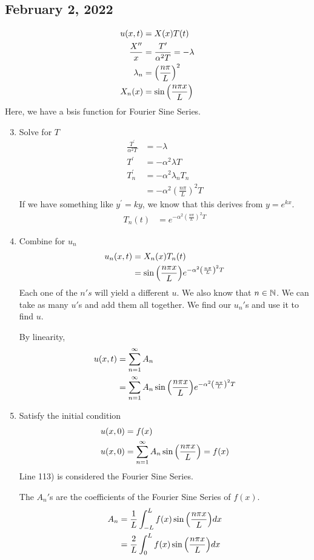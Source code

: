 \documentclass{article}
\begin{document}
\subsection*{February 2, 2022}
\begin{align}
  u(x, t) & = X(x)T(t)\\
  \frac{X^{\prime\prime}}{x} & = \frac{T^\prime}{\alpha^2 T} = - \lambda\\
  \lambda_n & = \left( \frac{n \pi}{L} \right)^2\\
  X_n(x) & = \sin \Big( \frac{n \pi x}{L} \Big)
\end{align}
Here, we have a bsis function for Fourier Sine Series.
\begin{enumerate}
  \setcounter{enumi}{2}
  \item Solve for $T$
  \begin{align}
    \frac{T^\prime}{\alpha^2 T} & = - \lambda\\
    T^\prime & = -\alpha^2 \lambda T\\
    T^\prime_n & = - \alpha^2 \lambda_n T_n\\
    & = -\alpha^2 \left( \frac{n \pi}{L} \right)^2 T
  \end{align}
  If we have something like $y^\prime = ky$, we know that this derives from $y = e^{kx}$.
  \begin{align}
    T_n(t) & = e^{-\alpha^2 \left( \frac{n \pi}{L} \right)^2 T}
  \end{align}
  \item Combine for $u_n$
  \begin{align}
    u_n(x, t) & = X_n(x)T_n(t)\\
    & = \sin \Big( \frac{n \pi x}{L} \Big) e^{-\alpha^2 \left( \frac{n \pi}{L} \right)^2 T}
  \end{align}
  Each one of the $n's$ will yield a different $u$. We also know that $n \in \mathbb N$. We can take as many $u'$s and add them all together. We find our $u_n'$s and use it to find $u$.

  By linearity,
  \begin{align}
    u(x, t) & = \sum^\infty_{n = 1} A_n\\
    & = \sum^\infty_{n = 1} A_n \sin \Big( \frac{n \pi x}{L} \Big) e^{-\alpha^2 \left( \frac{n \pi}{L} \right)^2 T}
  \end{align}

  \item Satisfy the initial condition
  \begin{align}
    u(x, 0) & = f(x)\\
    u(x, 0) & = \sum^\infty_{n = 1} A_n \sin \Big( \frac{n \pi x}{L} \Big) = f(x)
  \end{align}
  Line 113) is considered the Fourier Sine Series.

  The $A_n'$s are the coefficients of the Fourier Sine Series of $f(x)$.
  \begin{align}
    A_n & = \frac{1}{L} \int^L_{-L} f(x) \sin \Big( \frac{n \pi x}{L} \Big) dx\\
    & = \frac{2}{L} \int^L_0 f(x) \sin \Big( \frac{n \pi x}{L} \Big) dx
  \end{align}
\end{enumerate}
\end{document}
